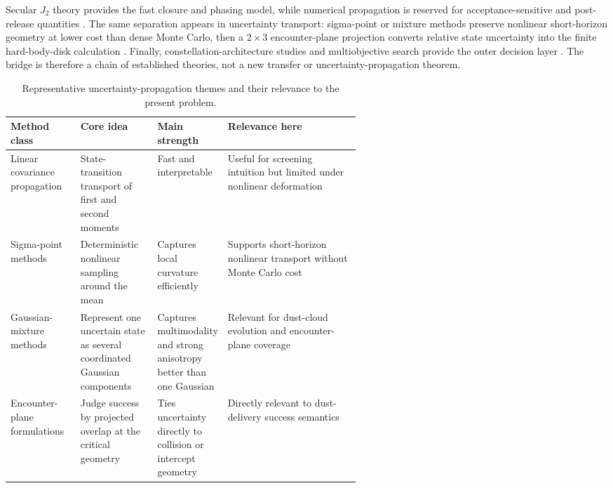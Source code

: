 Secular \(J_2\) theory provides the fast closure and phasing model, while numerical propagation is reserved for acceptance-sensitive and post-release quantities \cite{vallado2013}. The same separation appears in uncertainty transport: sigma-point or mixture methods preserve nonlinear short-horizon geometry at lower cost than dense Monte Carlo, then a \(2\times3\) encounter-plane projection converts relative state uncertainty into the finite hard-body-disk calculation \cite{unscented_transform,LUO201723}. Finally, constellation-architecture studies and multiobjective search provide the outer decision layer \cite{walker1970,williams2001MOGA,ferringer2006jsr}. The bridge is therefore a chain of established theories, not a new transfer or uncertainty-propagation theorem.

\begin{table}[htb]
    \centering
    \caption[Uncertainty-propagation themes]{Representative uncertainty-propagation themes and their relevance to the present problem.}
    \label{tab:uncertainty_propagation_themes}
    \begin{tabularx}{0.94\linewidth}{@{}L{0.20\linewidth}L{0.22\linewidth}L{0.16\linewidth}Y@{}}
        \toprule
        Method class & Core idea & Main strength & Relevance here \\
        \midrule
        Linear covariance propagation & State-transition transport of first and second moments & Fast and interpretable & Useful for screening intuition but limited under nonlinear deformation \\
        Sigma-point methods & Deterministic nonlinear sampling around the mean & Captures local curvature efficiently & Supports short-horizon nonlinear transport without Monte Carlo cost \\
        Gaussian-mixture methods & Represent one uncertain state as several coordinated Gaussian components & Captures multimodality and strong anisotropy better than one Gaussian & Relevant for dust-cloud evolution and encounter-plane coverage \\
        Encounter-plane formulations & Judge success by projected overlap at the critical geometry & Ties uncertainty directly to collision or intercept geometry & Directly relevant to dust-delivery success semantics \\
        \bottomrule
    \end{tabularx}
\end{table}

\FloatBarrier

